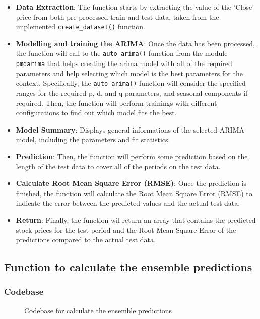 \documentclass[11pt]{article}
\begin{document}
\begin{itemize}
    \item \textbf{Data Extraction}: The function starts by extracting the value of the 'Close' price from both pre-processed train and test data, taken from the implemented \texttt{create\_dataset()} function.
    \item \textbf{Modelling and training the ARIMA}: Once the data has been processed, the function will call to the \texttt{auto\_arima()} function from the module \texttt{pmdarima} that helps creating the arima model with all of the required parameters and help selecting which model is the best parameters for the context. Specifically, the \texttt{auto\_arima()} function will consider the specified ranges for the required p, d, and q parameters, and seasonal components if required. Then, the function will perform trainings with different configurations to find out which model fits the best.
    \item \textbf{Model Summary}: Displays general informations of the selected ARIMA model, including the parameters and fit statistics.
    \item \textbf{Prediction}: Then, the function will perform some prediction based on the length of the test data to cover all of the periods on the test data.
    \item \textbf{Calculate Root Mean Square Error (RMSE)}: Once the prediction is finished, the function will calculate the Root Mean Square Error (RMSE) to indicate the error between the predicted values and the actual test data.
    \item \textbf{Return}: Finally, the function wil return an array that contains the predicted stock prices for the test period and the Root Mean Square Error of the predictions compared to the actual test data.
\end{itemize}

\subsection{Function to calculate the ensemble predictions}

\subsubsection{Codebase}

\begin{figure}[ht]
    \centering
    \caption{Codebase for calculate the ensemble predictions}
    \label{fig:ensemble_predictions_code}
\end{figure}
\end{document}
